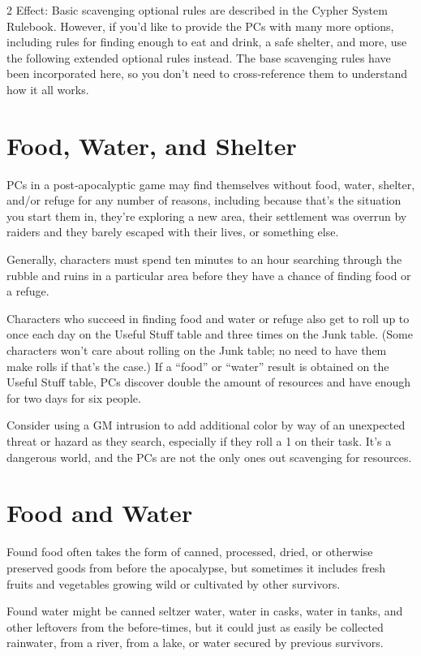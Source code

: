 \begin{multicols}{2}
Effect: Basic scavenging optional rules are described in the Cypher System Rulebook. However, if you’d like to provide the PCs with many more options, including rules for finding enough to eat and drink, a safe shelter, and more, use the following extended optional rules instead. The base scavenging rules have been incorporated here, so you don’t need to cross‑reference them to understand how it all works.

\section{Food, Water, and Shelter}

PCs in a post‑apocalyptic game may find themselves without food, water, shelter, and/or refuge for any number of reasons, including because that’s the situation you start them in, they’re exploring a new area, their settlement was overrun by raiders and they barely escaped with their lives, or something else. 

Generally, characters must spend ten minutes to an hour searching through the rubble and ruins in a particular area before they have a chance of finding food or a refuge. 

Characters who succeed in finding food and water or refuge also get to roll up to once each day on the Useful Stuff table and three times on the Junk table. (Some characters won’t care about rolling on the Junk table; no need to have them make rolls if that’s the case.) If a “food” or “water” result is obtained on the Useful Stuff table, PCs discover double the amount of resources and have enough for two days for six people. 

Consider using a GM intrusion to add additional color by way of an unexpected threat or hazard as they search, especially if they roll a 1 on their task. It’s a dangerous world, and the PCs are not the only ones out scavenging for resources.

\section{Food and Water}

Found food often takes the form of canned, processed, dried, or otherwise preserved goods from before the apocalypse, but sometimes it includes fresh fruits and vegetables growing wild or cultivated by other survivors. 

Found water might be canned seltzer water, water in casks, water in tanks, and other leftovers from the before‑times, but it could just as easily be collected rainwater, from a river, from a lake, or water secured by previous survivors.

\end{multicols}

